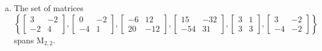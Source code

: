 \begin{exerciseAnswer}
\begin{enumerate}[(a)]
\item The set of matrices \( \left\{ \left[\begin{array}{cc}
3 & -2 \\
-2 & 4
\end{array}\right] , \left[\begin{array}{cc}
0 & -2 \\
-4 & 1
\end{array}\right] , \left[\begin{array}{cc}
-6 & 12 \\
20 & -12
\end{array}\right] , \left[\begin{array}{cc}
15 & -32 \\
-54 & 31
\end{array}\right] , \left[\begin{array}{cc}
3 & 1 \\
3 & 3
\end{array}\right] , \left[\begin{array}{cc}
3 & -2 \\
-4 & -2
\end{array}\right] \right\} \) spans \(\mathrm{M}_{2,2}\). 
\end{enumerate}
    
\end{exerciseAnswer}
    
